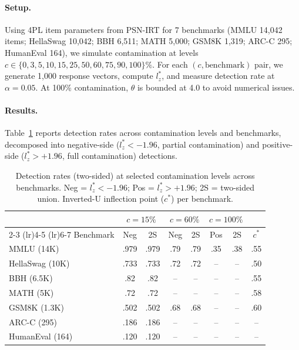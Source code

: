 \documentclass[11pt,a4paper]{article}
\begin{document}
\paragraph{Setup.} Using 4PL item parameters from PSN-IRT \citep{gu2024psn} for 7 benchmarks (MMLU 14,042 items; HellaSwag 10,042; BBH 6,511; MATH 5,000; GSM8K 1,319; ARC-C 295; HumanEval 164), we simulate contamination at levels $c \in \{0, 3, 5, 10, 15, 25, 50, 60, 75, 90, 100\}\%$. For each $(c, \text{benchmark})$ pair, we generate 1,000 response vectors, compute $l_z^*$, and measure detection rate at $\alpha=0.05$. At 100\% contamination, $\theta$ is bounded at 4.0 to avoid numerical issues.

\paragraph{Results.} Table~\ref{tab:extended_sim} reports detection rates across contamination levels and benchmarks, decomposed into negative-side ($l_z^* < -1.96$, partial contamination) and positive-side ($l_z^* > +1.96$, full contamination) detections.

\begin{table}[t]
\centering
\caption{Detection rates (two-sided) at selected contamination levels across benchmarks. Neg = $l_z^* < -1.96$; Pos = $l_z^* > +1.96$; 2S = two-sided union. Inverted-U inflection point ($c^*$) per benchmark.}
\label{tab:extended_sim}
\small
\begin{tabular}{l c c c c c c c}
\toprule
& \multicolumn{2}{c}{$c=15\%$} & \multicolumn{2}{c}{$c=60\%$} & \multicolumn{2}{c}{$c=100\%$} & \\
\cmidrule(lr){2-3} \cmidrule(lr){4-5} \cmidrule(lr){6-7}
Benchmark & Neg & 2S & Neg & 2S & Pos & 2S & $c^*$ \\
\midrule
MMLU (14K) & .979 & .979 & .79 & .79 & .35 & .38 & .55 \\
HellaSwag (10K) & .733 & .733 & .72 & .72 & -- & -- & .50 \\
BBH (6.5K) & .82 & .82 & -- & -- & -- & -- & .55 \\
MATH (5K) & .72 & .72 & -- & -- & -- & -- & .58 \\
GSM8K (1.3K) & .502 & .502 & .68 & .68 & -- & -- & .60 \\
ARC-C (295) & .186 & .186 & -- & -- & -- & -- & -- \\
HumanEval (164) & .120 & .120 & -- & -- & -- & -- & -- \\
\bottomrule
\end{tabular}
\end{table}
\end{document}
